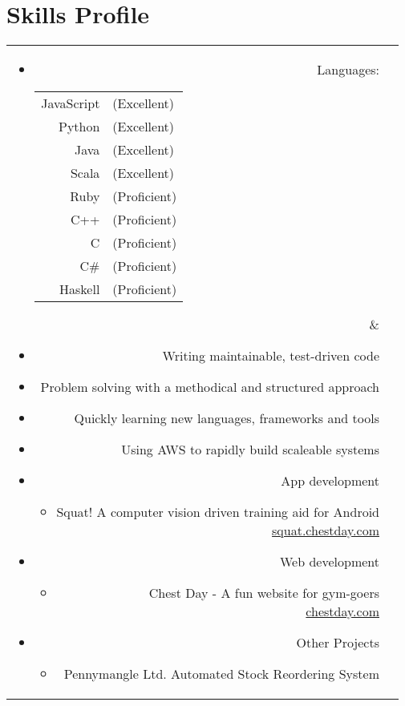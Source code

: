 \section*{Skills Profile}

\begin{tabular}{rl}

\parbox[t]{0.3\textwidth}{
	\begin{itemize}
		\item Languages:
		\begin{tabular}[h]{rl}
			JavaScript & (Excellent)\\
			Python & (Excellent)\\
			Java & (Excellent)\\
			Scala & (Excellent)\\
			Ruby & (Proficient)\\
			C++ & (Proficient)\\
			C & (Proficient)\\
			C\# & (Proficient)\\
			Haskell & (Proficient)
		\end{tabular}
	\end{itemize}}
&
\parbox[t]{0.6\textwidth}{
	\begin{itemize}
		\item Writing maintainable, test-driven code
		\item Problem solving with a methodical and structured approach
		\item Quickly learning new languages, frameworks and tools
		\item Using AWS to rapidly build scaleable systems
		\item App development
			\begin{itemize}
				\item Squat! A computer vision driven training aid for Android\\
				\url{squat.chestday.com}
			\end{itemize}
		\item Web development
			\begin{itemize}
				\item Chest Day - A fun website for gym-goers\\
				\url{chestday.com}
			\end{itemize}
		\item Other Projects
			\begin{itemize}
				\item Pennymangle Ltd. Automated Stock Reordering System\\
			\end{itemize}
	\end{itemize}}\\

\end{tabular}
